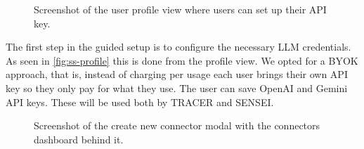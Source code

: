\begin{figure}[htpb]
  \centering
  \caption{Screenshot of the user profile view where users can set up their API key.}
  \label{fig:ss-profile}
\end{figure}

The first step in the guided setup
is to configure the necessary \ac{LLM} credentials.
As seen in \autoref{fig:ss-profile}
this is done from the profile view.
We opted for a \ac{BYOK} approach,
that is, instead of charging per usage
each user brings their own \ac{API} key
so they only pay for what they use.
The user can save OpenAI and Gemini \ac{API} keys.
These will be used both by \ac{TRACER} and SENSEI.

\begin{figure}[htpb]
  \centering
  \caption{Screenshot of the create new connector modal with the connectors dashboard behind it.}
  \label{fig:ss-new-connector}
\end{figure}

